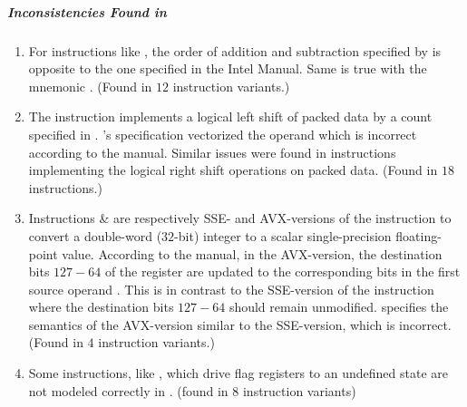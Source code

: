 \subparagraph{Inconsistencies Found in \Stoke}

\begin{enumerate}%
    \item For instructions like  , the order of 
addition and subtraction specified by \Stoke is opposite to the one specified 
in the Intel Manual. Same is true with the mnemonic . (Found 
in 
$12$ instruction variants.)
    
    \item  The instruction  implements a logical 
left shift of packed data by a count specified in . \Stoke's 
specification vectorized the operand  which is incorrect according 
to 
the manual. Similar issues were found in instructions implementing the logical 
right shift operations on packed data. (Found in  $18$ instructions.)
    
    \item Instructions  \&  
 are respectively SSE- and AVX-versions of the 
instruction to  convert a double-word ($32$-bit) integer to a scalar 
single-precision floating-point value. According to the manual, in the 
AVX-version,  the  destination bits $127-64$ of the  register  are 
updated to the corresponding bits in the first source operand . 
This  
is in contrast to the SSE-version of the instruction where the destination 
bits 
$127-64$ should remain unmodified. \Stoke specifies the semantics of the 
AVX-version similar to the SSE-version, which is incorrect.  (Found in $4$ 
instruction variants.)
    
    \item Some instructions, like , which drive flag 
registers to an undefined state are not modeled correctly in \Stoke.    (found 
in $8$ instruction variants)  
\end{enumerate}

